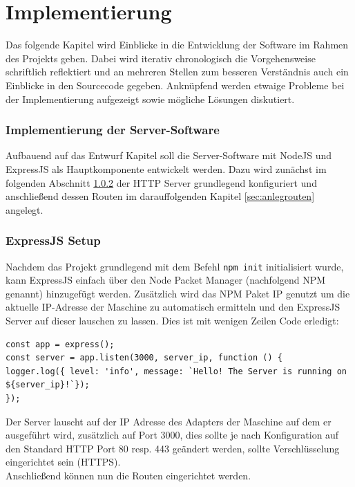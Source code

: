 \section{Implementierung}\label{sec:implementierung}
Das folgende Kapitel wird Einblicke in die Entwicklung der Software im Rahmen des Projekts geben. 
Dabei wird iterativ chronologisch die Vorgehensweise schriftlich reflektiert und an mehreren Stellen 
zum besseren Verständnis auch ein Einblicke in den Sourcecode gegeben. Anknüpfend werden etwaige Probleme bei der Implementierung aufgezeigt sowie mögliche Lösungen diskutiert. 

\subsubsection{Implementierung der Server-Software}\label{sec:implementserver}
Aufbauend auf das Entwurf Kapitel soll die Server-Software mit NodeJS und ExpressJS als Hauptkomponente entwickelt werden. Dazu wird zunächst im folgenden Abschnitt \ref{sec:implementexpress} der HTTP Server grundlegend konfiguriert und anschließend dessen Routen im darauffolgenden Kapitel \ref{sec:anlegrouten} angelegt. 

\subsubsection{ExpressJS Setup}\label{sec:implementexpress}
Nachdem das Projekt grundlegend mit dem Befehl \texttt{npm init} initialisiert wurde,
kann ExpressJS einfach über den Node Packet Manager (nachfolgend NPM genannt) hinzugefügt werden. 
Zusätzlich wird das NPM Paket IP genutzt um die aktuelle IP-Adresse der Maschine zu automatisch ermitteln und
den ExpressJS Server auf dieser lauschen zu lassen. Dies ist mit wenigen Zeilen Code erledigt:
\begin{lstlisting}[caption=Errichtung des Webservers]
const app = express();
const server = app.listen(3000, server_ip, function () {
logger.log({ level: 'info', message: `Hello! The Server is running on ${server_ip}!`});
});
\end{lstlisting}
Der Server lauscht auf der IP Adresse des Adapters der Maschine auf dem er ausgeführt wird, zusätzlich auf Port 3000, dies sollte je nach Konfiguration auf den Standard HTTP Port 80 resp. 443 geändert werden, sollte Verschlüsselung eingerichtet sein (HTTPS).
\\
Anschließend können nun die Routen eingerichtet werden.

